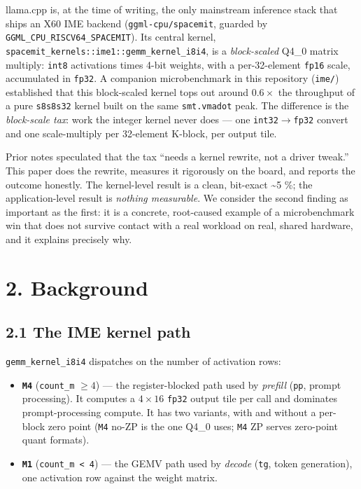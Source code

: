 \documentclass[
]{article}
\providecommand{\tightlist}{%
  \setlength{\itemsep}{0pt}\setlength{\parskip}{0pt}}
\begin{document}
llama.cpp is, at the time of writing, the only mainstream inference
stack that ships an X60 IME backend (\texttt{ggml-cpu/spacemit}, guarded
by \texttt{GGML\_CPU\_RISCV64\_SPACEMIT}). Its central kernel,
\texttt{spacemit\_kernels::ime1::gemm\_kernel\_i8i4}, is a
\emph{block-scaled} Q4\_0 matrix multiply: \texttt{int8} activations
times 4-bit weights, with a per-32-element \texttt{fp16} scale,
accumulated in \texttt{fp32}. A companion microbenchmark in this
repository (\texttt{ime/}) established that this block-scaled kernel
tops out around \(0.6\times\) the throughput of a pure \texttt{s8s8s32}
kernel built on the same \texttt{smt.vmadot} peak. The difference is the
\emph{block-scale tax}: work the integer kernel never does --- one
\texttt{int32}\(\to\)\texttt{fp32} convert and one scale-multiply per
32-element K-block, per output tile.

Prior notes speculated that the tax ``needs a kernel rewrite, not a
driver tweak.'' This paper does the rewrite, measures it rigorously on
the board, and reports the outcome honestly. The kernel-level result is
a clean, bit-exact \textasciitilde5 \%; the application-level result is
\emph{nothing measurable}. We consider the second finding as important
as the first: it is a concrete, root-caused example of a microbenchmark
win that does not survive contact with a real workload on real, shared
hardware, and it explains precisely why.

\section{2. Background}\label{background}

\subsection{2.1 The IME kernel path}\label{the-ime-kernel-path}

\texttt{gemm\_kernel\_i8i4} dispatches on the number of activation rows:

\begin{itemize}
\tightlist
\item
  \textbf{\texttt{M4}} (\texttt{count\_m} \(\geq 4\)) --- the
  register-blocked path used by \emph{prefill} (\texttt{pp}, prompt
  processing). It computes a \(4\times16\) \texttt{fp32} output tile per
  call and dominates prompt-processing compute. It has two variants,
  with and without a per-block zero point (\texttt{M4} no-ZP is the one
  Q4\_0 uses; \texttt{M4} ZP serves zero-point quant formats).
\item
  \textbf{\texttt{M1}} (\texttt{count\_m\ \textless{}\ 4}) --- the GEMV
  path used by \emph{decode} (\texttt{tg}, token generation), one
  activation row against the weight matrix.
\end{itemize}
\end{document}
